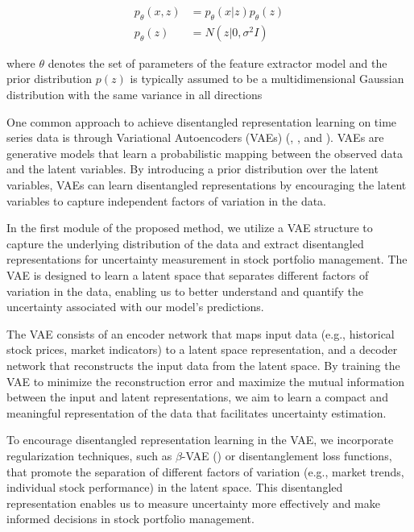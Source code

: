 \begin{align}
	p_\theta(x,z) &= p_\theta(x|z) p_\theta(z) \label{eq:1}\\
	p_\theta(z) &= N(z|0, \sigma^2 I) \label{eq:2}
\end{align}

where $\theta$ denotes the set of parameters of the feature extractor model and the prior distribution $p(z)$ is typically assumed to be a multidimensional Gaussian distribution with the same variance in all directions 


One common approach to achieve disentangled representation learning on time series data is through Variational Autoencoders (VAEs) (\citet{duan2019unsupervised}, \citet{li2022towards}, and \citet{li2021learning}). VAEs are generative models that learn a probabilistic mapping between the observed data and the latent variables. By introducing a prior distribution over the latent variables, VAEs can learn disentangled representations by encouraging the latent variables to capture independent factors of variation in the data.

In the first module of the proposed method, we utilize a VAE structure to capture the underlying distribution of the data and extract disentangled representations for uncertainty measurement in stock portfolio management. The VAE is designed to learn a latent space that separates different factors of variation in the data, enabling us to better understand and quantify the uncertainty associated with our model's predictions.

The VAE consists of an encoder network that maps input data (e.g., historical stock prices, market indicators) to a latent space representation, and a decoder network that reconstructs the input data from the latent space. By training the VAE to minimize the reconstruction error and maximize the mutual information between the input and latent representations, we aim to learn a compact and meaningful representation of the data that facilitates uncertainty estimation.

To encourage disentangled representation learning in the VAE, we incorporate regularization techniques, such as $\beta$-VAE (\citet{burgess2018understanding}) or disentanglement loss functions, that promote the separation of different factors of variation (e.g., market trends, individual stock performance) in the latent space. This disentangled representation enables us to measure uncertainty more effectively and make informed decisions in stock portfolio management.

